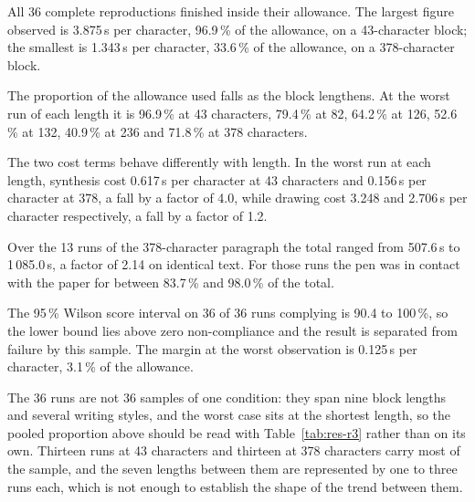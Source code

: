         \medskip

        All 36 complete reproductions finished inside their allowance. The
        largest figure observed is 3.875\,s per character, 96.9\,\% of the
        allowance, on a 43-character block; the smallest is 1.343\,s per
        character, 33.6\,\% of the allowance, on a 378-character block.

        The proportion of the allowance used falls as the block lengthens. At
        the worst run of each length it is 96.9\,\% at 43 characters, 79.4\,\%
        at 82, 64.2\,\% at 126, 52.6\,\% at 132, 40.9\,\% at 236 and 71.8\,\% at
        378 characters.

        The two cost terms behave differently with length. In the worst run at
        each length, synthesis cost 0.617\,s per character at 43 characters and
        0.156\,s per character at 378, a fall by a factor of 4.0, while drawing
        cost 3.248 and 2.706\,s per character respectively, a fall by a factor
        of 1.2.

        Over the 13 runs of the 378-character paragraph the total ranged from
        507.6\,s to 1\,085.0\,s, a factor of 2.14 on identical text. For those
        runs the pen was in contact with the paper for between 83.7\,\% and
        98.0\,\% of the total.

        \medskip

        The 95\,\% Wilson score interval on 36 of 36 runs complying is 90.4 to
        100\,\%, so the lower bound lies above zero non-compliance and the
        result is separated from failure by this sample. The margin at the worst
        observation is 0.125\,s per character, 3.1\,\% of the allowance.

        The 36 runs are not 36 samples of one condition: they span nine block
        lengths and several writing styles, and the worst case sits at the
        shortest length, so the pooled proportion above should be read with
        Table~\ref{tab:res-r3} rather than on its own. Thirteen runs at 43
        characters and thirteen at 378 characters carry most of the sample, and
        the seven lengths between them are represented by one to three runs
        each, which is not enough to establish the shape of the trend between
        them.

\medskip

        \medskip

